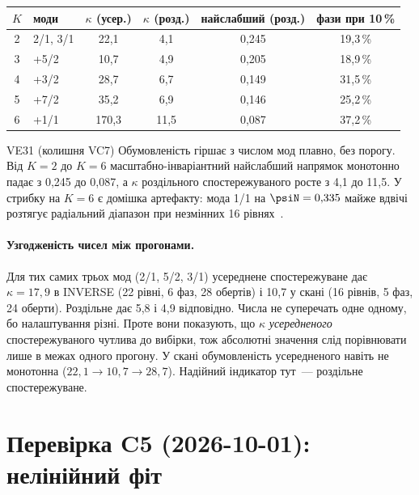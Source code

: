 \begin{center}\small
\begin{tabular}{clcccc}
\toprule
$K$ & моди & $\kappa$ (усер.) & $\kappa$ (розд.) & найслабший (розд.) & фази при 10\,\%\\
\midrule
2 & 2/1, 3/1 & 22,1 & 4,1 & 0,245 & 19,3\,\%\\
3 & +5/2 & 10,7 & 4,9 & 0,205 & 18,9\,\%\\
4 & +3/2 & 28,7 & 6,7 & 0,149 & 31,5\,\%\\
5 & +7/2 & 35,2 & 6,9 & 0,146 & 25,2\,\%\\
6 & +1/1 & 170,3 & 11,5 & 0,087 & 37,2\,\%\\
\bottomrule
\end{tabular}
\end{center}

\begin{established}{VE31 (колишня VC7)}
Обумовленість гіршає з числом мод плавно, без порогу. Від $K=2$ до $K=6$ масштабно-інваріантний найслабший напрямок монотонно падає з 0,245 до 0,087, а $\kappa$ роздільного спостережуваного росте з 4,1 до 11,5. У стрибку на $K=6$ є домішка артефакту: мода 1/1 на $\psiN=0{,}335$ майже вдвічі розтягує радіальний діапазон при незмінних 16 рівнях~\cite{RegViz,g07Campaign}.
\end{established}

\paragraph{Узгодженість чисел між прогонами.} Для тих самих трьох мод (2/1, 5/2, 3/1) усереднене спостережуване дає $\kappa=17{,}9$ в INVERSE (22 рівні, 6 фаз, 28 обертів) і 10,7 у скані (16 рівнів, 5 фаз, 24 оберти). Роздільне дає 5,8 і 4,9 відповідно. Числа не суперечать одне одному, бо налаштування різні. Проте вони показують, що $\kappa$ \emph{усередненого} спостережуваного чутлива до вибірки, тож абсолютні значення слід порівнювати лише в межах одного прогону. У скані обумовленість усередненого навіть не монотонна ($22{,}1\to10{,}7\to28{,}7$). Надійний індикатор тут~--- роздільне спостережуване.

\section{Перевірка C5 (2026-10-01): нелінійний фіт}\label{sec:g07-c5test}

